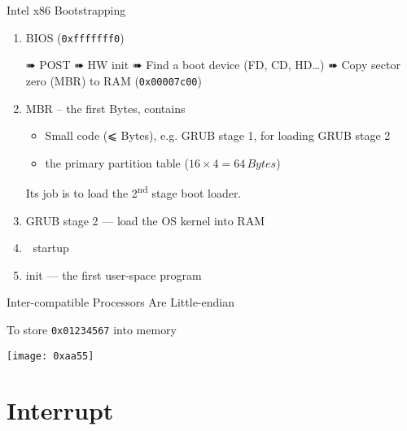 \begin{frame}{Intel x86 Bootstrapping}
  \begin{enumerate}
  \item BIOS (\texttt{0xfffffff0})\\
    \begin{small}
      ➠ POST\quad
      ➠ HW init\quad
      ➠ Find a boot device (FD, CD, HD\ldots{})\quad
      ➠ Copy \alert{sector zero (MBR)} to RAM (\texttt{0x00007c00})
    \end{small}
  \item MBR -- the first \unit[512]{Bytes}, contains
    \begin{itemize}
    \item Small code (⩽ \unit[446]{Bytes}), e.g. GRUB stage 1, for loading GRUB stage 2
    \item the primary partition table ($16\times{}4=64\,Bytes$)
    \end{itemize}
    Its job is to load the 2\textsuperscript{nd} stage boot loader.
  \item GRUB stage 2 --- load the OS kernel into RAM
  \item {} startup
  \item init --- the first user-space program
  \end{enumerate}
  \begin{center}
  \end{center}
\end{frame}

\begin{frame}{Inter-compatible Processors Are Little-endian}
  \begin{iblock}{To store \texttt{0x01234567} into memory}
    \begin{center}
      \texttt{[image: 0xaa55]}
    \end{center}
  \end{iblock}
\end{frame}

\section{Interrupt}
\label{sec:interrupt}


